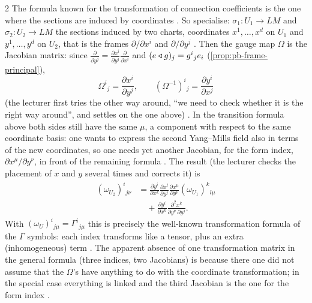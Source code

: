 \begin{paracol}{2}
The formula known for the transformation of connection coefficients is the one where the sections are induced by coordinates  . So specialise: $\sigma_1\colon U_1\to LM$ and $\sigma_2\colon U_2\to LM$ the sections induced by two charts, coordinates $x^1,\dots,x^d$ on $U_1$ and $y^1,\dots,y^d$ on $U_2$, that is the frames $\partial/\partial x^i$ and $\partial/\partial y^j$   . Then the gauge map $\Omega$ is the Jacobian matrix: since $\frac{\partial}{\partial y^j}=\frac{\partial x^i}{\partial y^j}\frac{\partial}{\partial x^i}$ and $(e\mathbin{\triangleleft} g)_j=g^i{}_je_i$ (\cref{prop:pb-frame-principal}),
\[
  \Omega^i{}_j=\frac{\partial x^i}{\partial y^j},\qquad(\Omega^{-1})^i{}_j=\frac{\partial y^i}{\partial x^j}
\]
(the lecturer first tries the other way around, ``we need to check whether it is the right way around'', and settles on the one above)   . In the transition formula above both sides still have the same $\mu$, a component with respect to the same coordinate basis: one wants to express the second Yang--Mills field also in terms of the new coordinates, so one needs yet another Jacobian, for the form index, $\partial x^\mu/\partial y^\nu$, in front of the remaining formula   . The result (the lecturer checks the placement of $x$ and $y$ several times and corrects it) is
\[
  \begin{aligned}
  (\omega_{U_2})^i{}_{j\nu}&=\frac{\partial y^i}{\partial x^k}\frac{\partial x^l}{\partial y^j}\frac{\partial x^\mu}{\partial y^\nu}(\omega_{U_1})^k{}_{l\mu}\\
  &\quad+\frac{\partial y^i}{\partial x^k}\frac{\partial^2x^k}{\partial y^\nu\,\partial y^j} .
  \end{aligned}
\]
     With $(\omega_U)^i{}_{j\mu}=\Gamma^i{}_{j\mu}$ this is precisely the well-known transformation formula of the $\Gamma$ symbols: each index transforms like a tensor, plus an extra (inhomogeneous) term . The apparent absence of one transformation matrix in the general formula (three indices, two Jacobians) is because there one did not assume that the $\Omega$'s have anything to do with the coordinate transformation; in the special case everything is linked and the third Jacobian is the one for the form index  .


\end{paracol}
